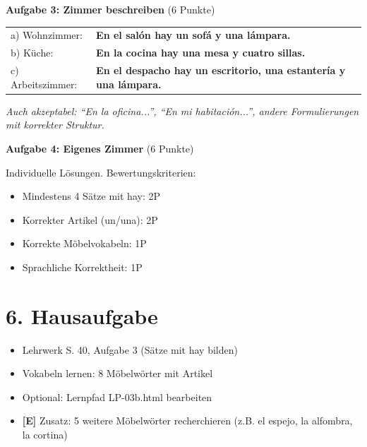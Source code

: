 \documentclass[11pt, a4paper]{article}
\newcommand{\sequenz}{03}
\newcommand{\block}{b}
\newcommand{\E}{\textcolor{erweiterung}{\textbf{[E]}}}
\newcommand{\loesung}[1]{\textcolor{loesung}{\textbf{#1}}}
\begin{document}
\vspace{1em}

\textbf{Aufgabe 3: Zimmer beschreiben} (6 Punkte)

\begin{tabular}{ll}
a) Wohnzimmer: & \loesung{En el salón hay un sofá y una lámpara.} \\
b) Küche: & \loesung{En la cocina hay una mesa y cuatro sillas.} \\
c) Arbeitszimmer: & \loesung{En el despacho hay un escritorio, una estantería y una lámpara.} \\
\end{tabular}

\textit{Auch akzeptabel: ``En la oficina...'', ``En mi habitación...'', andere Formulierungen mit korrekter Struktur.}

\vspace{1em}

\textbf{Aufgabe 4: Eigenes Zimmer} (6 Punkte)

Individuelle Lösungen. Bewertungskriterien:
\begin{itemize}
    \item Mindestens 4 Sätze mit hay: 2P
    \item Korrekter Artikel (un/una): 2P
    \item Korrekte Möbelvokabeln: 1P
    \item Sprachliche Korrektheit: 1P
\end{itemize}


\section*{6. Hausaufgabe}

\begin{itemize}
    \item Lehrwerk S. 40, Aufgabe 3 (Sätze mit hay bilden)
    \item Vokabeln lernen: 8 Möbelwörter mit Artikel
    \item Optional: Lernpfad LP-\sequenz\block.html bearbeiten
    \item \E{} Zusatz: 5 weitere Möbelwörter recherchieren (z.B. el espejo, la alfombra, la cortina)
\end{itemize}

\end{document}
